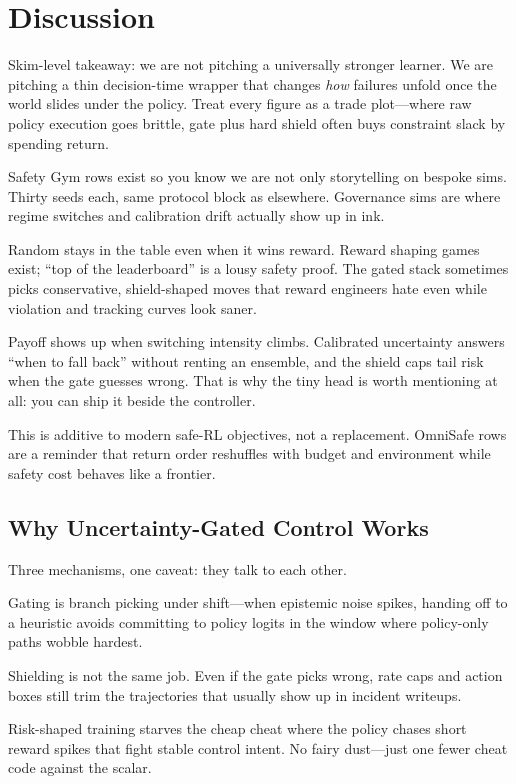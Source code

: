 \section{Discussion}

Skim-level takeaway: we are not pitching a universally stronger learner. We are pitching a thin decision-time wrapper that changes \emph{how} failures unfold once the world slides under the policy. Treat every figure as a trade plot---where raw policy execution goes brittle, gate plus hard shield often buys constraint slack by spending return.

Safety Gym rows exist so you know we are not only storytelling on bespoke sims. Thirty seeds each, same protocol block as elsewhere. Governance sims are where regime switches and calibration drift actually show up in ink.

Random stays in the table even when it wins reward. Reward shaping games exist; ``top of the leaderboard'' is a lousy safety proof. The gated stack sometimes picks conservative, shield-shaped moves that reward engineers hate even while violation and tracking curves look saner.

Payoff shows up when switching intensity climbs. Calibrated uncertainty answers ``when to fall back'' without renting an ensemble, and the shield caps tail risk when the gate guesses wrong. That is why the tiny head is worth mentioning at all: you can ship it beside the controller.

This is additive to modern safe-RL objectives, not a replacement. OmniSafe rows are a reminder that return order reshuffles with budget and environment while safety cost behaves like a frontier.

\subsection{Why Uncertainty-Gated Control Works}

Three mechanisms, one caveat: they talk to each other.

Gating is branch picking under shift---when epistemic noise spikes, handing off to a heuristic avoids committing to policy logits in the window where policy-only paths wobble hardest.

Shielding is not the same job. Even if the gate picks wrong, rate caps and action boxes still trim the trajectories that usually show up in incident writeups.

Risk-shaped training starves the cheap cheat where the policy chases short reward spikes that fight stable control intent. No fairy dust---just one fewer cheat code against the scalar.

